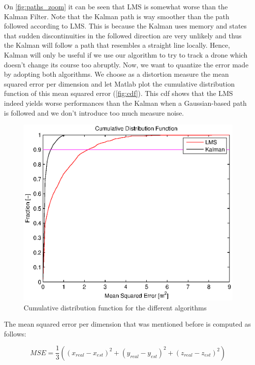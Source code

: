 \documentclass[a4paper]{article}        %
\begin{document}
On \autoref{fig:paths_zoom} it can be seen that LMS is somewhat worse than the Kalman Filter. Note that the Kalman path is way smoother than the path followed according to LMS. This is because the Kalman uses memory and states that sudden discontinuities in the followed direction are very unlikely and thus the Kalman will follow a path that resembles a straight line locally. Hence, Kalman will only be useful if we use our algorithm to try to track a drone which doesn't change its course too abruptly.
Now, we want to quantize the error made by adopting both algorithms. We choose as a distortion measure the mean squared error per dimension and let Matlab plot the cumulative distribution function of this mean squared error (\autoref{fig:cdf}). This cdf shows that the LMS indeed yields worse performances than the Kalman when a Gaussian-based path is followed and we don't introduce too much measure noise.
			
			\begin{figure}[H]
				\centering
				\includegraphics[width=\textwidth]{images/cdf_algorithms.eps}
				\caption{Cumulative distribution function for the different algorithms}
				\label{fig:cdf}
			\end{figure}

The mean squared error per dimension that was mentioned before is computed as follows:

\begin{equation}
MSE = \dfrac{1}{3}((x_{real}-x_{est})^2+(y_{real}-y_{est})^2+(z_{real}-z_{est})^2)
\end{equation}
\end{document}
